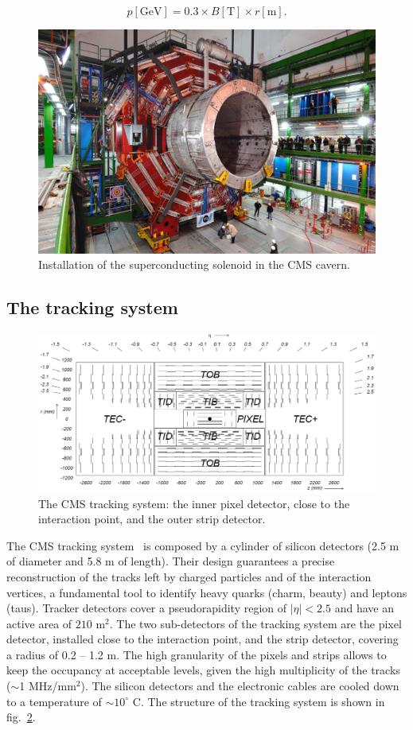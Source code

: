 \begin{equation}
p [\text{GeV}] = 0.3 \times B [\text{T}] \times r [\text{m}]. 
\end{equation}

\begin{figure}[!htb]
  \centering
    \includegraphics[width=.5\textwidth]{figures/CMS_solenoid.jpeg}
  \caption{Installation of the superconducting solenoid in the CMS cavern.~\cite{Chatrchyan:2008zzk}}
  \label{fig:CMS_solenoid}
\end{figure}

\subsection{The tracking system}
\begin{figure}[!htb]
  \centering
    \includegraphics[width=.9\textwidth]{figures/cmstracker.png}
  \caption{The CMS tracking system: the inner pixel detector, close to the interaction point, and the outer strip detector.~\cite{Chatrchyan:2008zzk}}
  \label{fig:CMS_tracker}
\end{figure}

The CMS tracking system~\cite{Karimäki:368412,Chatrchyan:2014fea} is composed by a cylinder of silicon detectors (2.5 m of diameter and 5.8 m of length). Their design guarantees a precise reconstruction of the tracks left by charged particles and of the interaction vertices, a fundamental tool to identify heavy quarks (charm, beauty) and leptons (taus).
Tracker detectors cover a pseudorapidity region of $|\eta|<2.5$ and have an active area of $210\text{ m}^2$. The two sub-detectors of the tracking system are the pixel detector, installed close to the interaction point, and the strip detector, covering a radius of 0.2 -- 1.2 m. The high granularity of the pixels and strips allows to keep the occupancy at acceptable levels, given the high multiplicity of the tracks ($\sim$1 MHz/$\text{mm}^2$). The silicon detectors and the electronic cables are cooled down to a temperature of $\sim 10^{\circ}$ C. The structure of the tracking system is shown in fig.~\ref{fig:CMS_tracker}.

